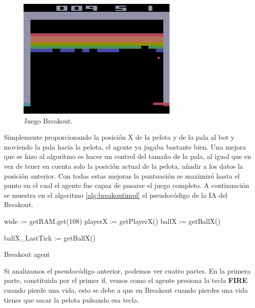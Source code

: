 \begin{figure}[h]
	\centering
	\includegraphics[width=0.7\textwidth]{Figures/breakoutgame}
	\caption{Juego Breakout.}
	\label{fig:breakoutgame}
\end{figure}

Simplemente proporcionando la posición X de la pelota y de la pala al bot y moviendo la pala hacia la pelota, el agente ya jugaba bastante bien. Una mejora que se hizo al algoritmo es hacer un control del tamaño de la pala, al igual que en vez de tener en cuenta solo la posición actual de la pelota, añadir a los datos la posición anterior. Con todas estas mejoras la puntuación se maximizó hasta el punto en el cual el agente fue capaz de pasarse el juego completo. A continuación se muestra en el algoritmo \ref{alg:breakoutimpl}
el pseudocódigo de la IA del Breakout.

\vspace{4mm}
\begin{algorithm}[H]
	
	wide := getRAM.get(108)\;
	playerX := getPlayerX()\;
	ballX := getBallX()\;
	

	ballX\_LastTick := getBallX()\;
	
	\caption{Breakout agent}
	\label{alg:breakoutimpl}
\end{algorithm}

Si analizamos el pseudocódigo anterior, podemos ver cuatro partes. En la primera parte, constituida por el primer if, vemos como el agente presiona la tecla \textbf{FIRE} cuando pierde una vida, esto se debe a que en Breakout cuando pierdes una vida tienes que sacar la pelota pulsando esa tecla. 


